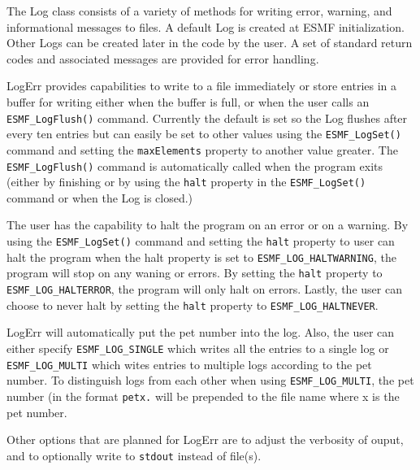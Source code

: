



The Log class consists of a variety of methods for writing error, warning, and
informational messages to files.  A default Log is created at ESMF
initialization.  Other Logs can be created later in the code by the user.  A set
of standard return codes and associated messages are provided for error 
handling.  

LogErr provides capabilities to write to a file immediately or store entries in a 
buffer for writing either when the buffer is full, or when the user calls an 
{\tt ESMF\_LogFlush()} command.  Currently the default is set so the Log flushes
after every ten entries but can easily be set to other values using the 
{\tt ESMF\_LogSet()} command and setting the {\tt maxElements} property to another 
value greater.  The {\tt ESMF\_LogFlush()} command is automatically called when 
the program exits (either by finishing or by using the {\tt halt} property in the 
{\tt ESMF\_LogSet()} command or when the Log is closed.)

The user has the capability to halt the program on an error or on a warning.  By 
using the {\tt ESMF\_LogSet()} command and setting the {\tt halt} property to
user can halt the program when the halt property is set to 
{\tt ESMF\_LOG\_HALTWARNING}, the program will stop on any waning or errors.  By
setting the {\tt halt} property to {\tt ESMF\_LOG\_HALTERROR}, the program will 
only halt on errors.  Lastly, the user can choose to never halt by setting the 
{\tt halt} property to {\tt ESMF\_LOG\_HALTNEVER}.

LogErr will automatically put the pet number into the log.  Also, the user can 
either specify {\tt ESMF\_LOG\_SINGLE} which writes all the entries to a single 
log or {\tt ESMF\_LOG\_MULTI} which wites entries to multiple logs according to 
the pet number.  To distinguish logs from each other when using 
{\tt ESMF\_LOG\_MULTI}, the pet number (in the format {\tt petx.} will be 
prepended to the file name where x is the pet number.
 
Other options that are planned for LogErr are to adjust the verbosity of ouput, 
and to optionally write to {\tt stdout} instead of file(s).




